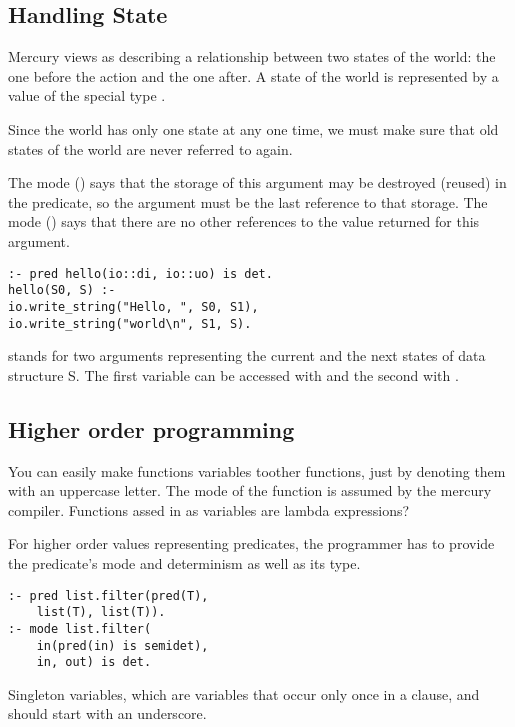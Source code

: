 \subsection{Handling State}
\begin{compactitem}
Mercury views  as describing a relationship between two states of the world: the one before the action and the one after. A state of the world is represented by a value of the special type .

\item Since the world has only one state at any one time, we must make sure that old states of the world are never referred to again.

\item The mode  () says that the storage of this argument may be destroyed (reused) in the predicate, so the argument must be the last reference to that storage. The mode  () says that there are no other references to the value returned for this argument.
\begin{lstlisting}
:- pred hello(io::di, io::uo) is det.
hello(S0, S) :-
io.write_string("Hello, ", S0, S1),
io.write_string("world\n", S1, S).
\end{lstlisting}

\item {} stands for two arguments representing the current and the next states of data structure S. The first variable can be accessed with  and the second with .

\subsection{Higher order programming}
\item You can easily make functions variables toother functions, just by denoting them with an uppercase letter. The mode of the function is assumed by the mercury compiler. Functions assed in as variables are lambda expressions?

\item For higher order values representing predicates, the programmer
has to provide the predicate’s mode and determinism as well as its type.
\begin{lstlisting}
:- pred list.filter(pred(T),
    list(T), list(T)).
:- mode list.filter(
    in(pred(in) is semidet),
    in, out) is det.
\end{lstlisting}
\item Singleton variables, which are variables that occur
only once in a clause, and should start with an underscore.


\end{compactitem}
